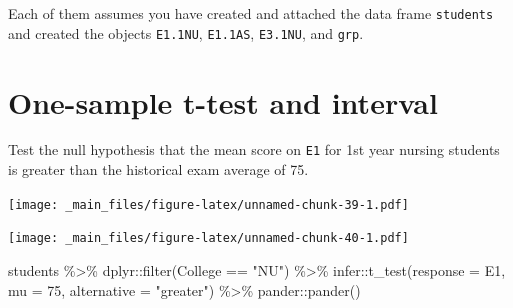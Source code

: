\documentclass[
]{book}
\newenvironment{Shaded}{\begin{snugshade}}{\end{snugshade}}
\newcommand{\AttributeTok}[1]{\textcolor[rgb]{0.77,0.63,0.00}{#1}}
\newcommand{\DecValTok}[1]{\textcolor[rgb]{0.00,0.00,0.81}{#1}}
\newcommand{\FunctionTok}[1]{\textcolor[rgb]{0.00,0.00,0.00}{#1}}
\newcommand{\NormalTok}[1]{#1}
\newcommand{\SpecialCharTok}[1]{\textcolor[rgb]{0.00,0.00,0.00}{#1}}
\newcommand{\StringTok}[1]{\textcolor[rgb]{0.31,0.60,0.02}{#1}}
\begin{document}
Each of them assumes you have created and attached the data frame \texttt{students} and created the objects \texttt{E1.1NU}, \texttt{E1.1AS}, \texttt{E3.1NU}, and \texttt{grp}.

\hypertarget{one-sample-t-test}{%
\section{One-sample t-test and interval}\label{one-sample-t-test}}

Test the null hypothesis that the mean score on \texttt{E1} for 1st year nursing students is greater than the historical exam average of 75.

\texttt{[image: \_main\_files/figure-latex/unnamed-chunk-39-1.pdf]}

\texttt{[image: \_main\_files/figure-latex/unnamed-chunk-40-1.pdf]}

\begin{Shaded}
\begin{Highlighting}[]
\NormalTok{students }\SpecialCharTok{\%\textgreater{}\%} 
\NormalTok{  dplyr}\SpecialCharTok{::}\FunctionTok{filter}\NormalTok{(College }\SpecialCharTok{==} \StringTok{"NU"}\NormalTok{) }\SpecialCharTok{\%\textgreater{}\%} 
\NormalTok{  infer}\SpecialCharTok{::}\FunctionTok{t\_test}\NormalTok{(}\AttributeTok{response =}\NormalTok{ E1, }\AttributeTok{mu =} \DecValTok{75}\NormalTok{, }\AttributeTok{alternative =} \StringTok{"greater"}\NormalTok{) }\SpecialCharTok{\%\textgreater{}\%} 
\NormalTok{  pander}\SpecialCharTok{::}\FunctionTok{pander}\NormalTok{()}
\end{Highlighting}
\end{Shaded}
\end{document}
